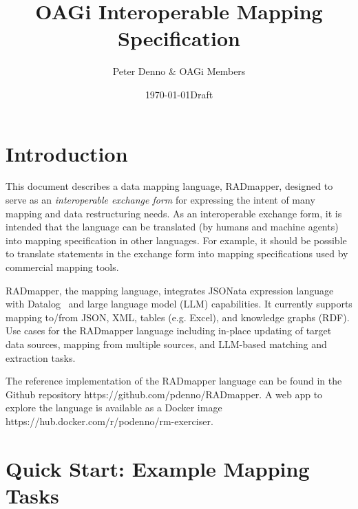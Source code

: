 \documentclass[10pt,letterpaper]{article} %
\begin{document}
\title{OAGi Interoperable Mapping Specification}
\author{Peter Denno \&  OAGi Members}
\date{\today \@ Draft}
\maketitle{}

\section{Introduction}
This document describes a data mapping language, RADmapper, designed to serve as an \textit{interoperable exchange form} for expressing the intent of many mapping and data restructuring needs.
As an interoperable exchange form, it is intended that the language can be translated (by humans and machine agents) into mapping specification in other languages.
For example, it should be possible to translate statements in the exchange form into mapping specifications used by commercial mapping tools.

RADmapper, the mapping language, integrates JSONata expression language~\cite{Jsonata.org2021} with Datalog~\cite{Abiteboul1995a} and large language model (LLM) capabilities.
It currently supports mapping to/from JSON, XML, tables (e.g. Excel), and knowledge graphs (RDF).
Use cases for the RADmapper language including in-place updating of target data sources, mapping from multiple sources, and LLM-based matching and extraction tasks.

\begin{sloppypar} %
The reference implementation of the RADmapper language can be found in the Github repository https://github.com/pdenno/RADmapper.
A web app to explore the language is available as a Docker image https://hub.docker.com/r/podenno/rm-exerciser.
\end{sloppypar}

\section{Quick Start: Example Mapping Tasks}
\end{document}
